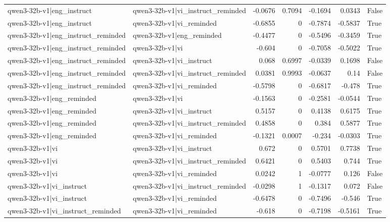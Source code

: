 \begin{table}
\begin{tabular}{l l r r r r l}
qwen3-32b-v1|eng_instruct & qwen3-32b-v1|vi_instruct_reminded & -0.0676 & 0.7094 & -0.1694 & 0.0343 & False \\
qwen3-32b-v1|eng_instruct & qwen3-32b-v1|vi_reminded & -0.6855 & 0 & -0.7874 & -0.5837 & True \\
qwen3-32b-v1|eng_instruct_reminded & qwen3-32b-v1|eng_reminded & -0.4477 & 0 & -0.5496 & -0.3459 & True \\
qwen3-32b-v1|eng_instruct_reminded & qwen3-32b-v1|vi & -0.604 & 0 & -0.7058 & -0.5022 & True \\
qwen3-32b-v1|eng_instruct_reminded & qwen3-32b-v1|vi_instruct & 0.068 & 0.6997 & -0.0339 & 0.1698 & False \\
qwen3-32b-v1|eng_instruct_reminded & qwen3-32b-v1|vi_instruct_reminded & 0.0381 & 0.9993 & -0.0637 & 0.14 & False \\
qwen3-32b-v1|eng_instruct_reminded & qwen3-32b-v1|vi_reminded & -0.5798 & 0 & -0.6817 & -0.478 & True \\
qwen3-32b-v1|eng_reminded & qwen3-32b-v1|vi & -0.1563 & 0 & -0.2581 & -0.0544 & True \\
qwen3-32b-v1|eng_reminded & qwen3-32b-v1|vi_instruct & 0.5157 & 0 & 0.4138 & 0.6175 & True \\
qwen3-32b-v1|eng_reminded & qwen3-32b-v1|vi_instruct_reminded & 0.4858 & 0 & 0.384 & 0.5877 & True \\
qwen3-32b-v1|eng_reminded & qwen3-32b-v1|vi_reminded & -0.1321 & 0.0007 & -0.234 & -0.0303 & True \\
qwen3-32b-v1|vi & qwen3-32b-v1|vi_instruct & 0.672 & 0 & 0.5701 & 0.7738 & True \\
qwen3-32b-v1|vi & qwen3-32b-v1|vi_instruct_reminded & 0.6421 & 0 & 0.5403 & 0.744 & True \\
qwen3-32b-v1|vi & qwen3-32b-v1|vi_reminded & 0.0242 & 1 & -0.0777 & 0.126 & False \\
qwen3-32b-v1|vi_instruct & qwen3-32b-v1|vi_instruct_reminded & -0.0298 & 1 & -0.1317 & 0.072 & False \\
qwen3-32b-v1|vi_instruct & qwen3-32b-v1|vi_reminded & -0.6478 & 0 & -0.7496 & -0.546 & True \\
qwen3-32b-v1|vi_instruct_reminded & qwen3-32b-v1|vi_reminded & -0.618 & 0 & -0.7198 & -0.5161 & True \\
\bottomrule
\end{tabular}
\end{table}
